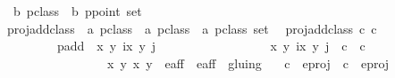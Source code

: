 %
	
\begin{isabellebody}%
\isamarkupfalse%
\ {\isacharparenleft}{\isacharprime}b{\isacharparenright}\ pclass\ {\isacharequal}\ {\isacartoucheopen}{\isacharparenleft}{\isacharprime}b{\isacharparenright}\ ppoint\ set{\isacartoucheclose} \\

proj{\isacharunderscore}add{\isacharunderscore}class\ {\isacharcolon}{\isacharcolon}\ {\isacharparenleft}{\isacharprime}a{\isacharparenright}\ pclass\ {\isasymRightarrow}\ {\isacharparenleft}{\isacharprime}a{\isacharparenright}\ pclass\ {\isasymRightarrow}\ {\isacharparenleft}{\isacharprime}a{\isacharparenright}\ pclass\ set\isanewline
\ \ proj{\isacharunderscore}add{\isacharunderscore}class\ c\ c\ {\isacharequal}\ \ \ \ \ \ \ \isanewline
\ \ \ \ \ \ \ \ {\isacharparenleft}p{\isacharunderscore}add\ {\isacharbackquote}\ {\isacharbraceleft}{\isacharparenleft}{\isacharparenleft}{\isacharparenleft}x\ y\ i{\isacharparenright}{\isacharcomma}{\isacharparenleft}{\isacharparenleft}x\ y\ j{\isacharparenright}{\isacharparenright}{\isachardot} \ \isanewline
\ \ \ \ \ \ \ \ \ \ \ \ \ \ \ \ {\isacharparenleft}{\isacharparenleft}{\isacharparenleft}x\ y\ i{\isacharparenright}{\isacharcomma}{\isacharparenleft}{\isacharparenleft}x\ y\ j{\isacharparenright}{\isacharparenright}\ {\isasymin}\ c\ {\isasymtimes}\ c\ {\isasymand}\ \isanewline
\ \ \ \ \ \ \ \ \ \ \ \ \ \ \ \ {\isacharparenleft}{\isacharparenleft}x\ y\ {\isacharparenleft}x\ y\ {\isasymin}\ e{\isacharprime}{\isacharunderscore}aff{\isacharunderscore}{}\ {\isasymunion}\ e{\isacharprime}{\isacharunderscore}aff{\isacharunderscore}{}{\isacharbraceright}{\isacharparenright}\ {\isacharslash}{\isacharslash}\ gluing\ \isanewline 
\ \ c\ {\isasymin}\ e{\isacharunderscore}proj\ \ c\ {\isasymin}\ e{\isacharunderscore}proj\ 
\isanewline

\end{isabellebody}%



